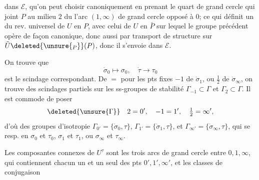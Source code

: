 dans $\mathcal E$, qu'on peut choisir canoniquement en prenant le quart de grand cercle qui joint $P$ au milieu $2$ du  l'arc $(1,\infty)$ de grand cercle opposé à $0$; ce qui définit un  du rev. universel de $U$ en $P$, avec celui de $U$ en $\bar P$ sur lequel le groupe précédent opère de façon canonique, donc aussi par transport de structure sur $\tilde U\deleted{\unsure{_P}}(P)$, donc il s'envoie dans $\mathcal E$.

On trouve que
\[
\dot\sigma_0\mapsto\sigma_0,\quad\dot\tau\to\tau_0
\]
est le scindage correspondant. De $=$ pour les pts fixes $-1$ de $\dot\sigma_1$, ou $\frac12$ de $\dot\sigma_\infty$, on trouve des scindages partiels sur les ss-groupes de  stabilité $\Gamma_{-1}\subset\Gamma$ et $\Gamma_2\subset\Gamma$. Il est commode de poser
\[
\deleted{\unsure{\Gamma}}\quad 2=0',\quad -1=1',\quad \tfrac12=\infty',
\]
d'où des groupes d'isotropie $\Gamma_{0'}=\{\dot\sigma_0,\tau\}$, $\Gamma_{1'}=\{\dot\sigma_1,\tau\}$, et $\Gamma_{\infty'}=\{\dot\sigma_\infty,\tau\}$, qui se  resp. en $\sigma_0$ et $\tau_0$,  $\sigma_1$ et $\tau_1$, ou $\sigma_\infty$ et $\tau_\infty$.

Les composantes connexes de $U^\tau$ sont les trois arcs de grand cercle entre $0,1,\infty$, qui contiennent chacun un  et un seul des pts $0',1',\infty'$, et les classes de conjugaison
